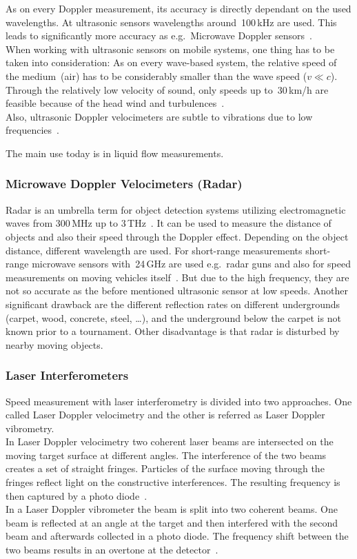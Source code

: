 \documentclass[12pt,a4paper]{article}
\begin{document}
As on every Doppler measurement, its accuracy is directly dependant on the used wavelengths.
At ultrasonic sensors wavelengths around~100\,kHz are used. 
This leads to significantly more accuracy as e.g.\ Microwave Doppler sensors~\cite{ultrasonic}.\\
When working with ultrasonic sensors on mobile systems, one thing has to be taken into consideration: 
As on every wave-based system, the relative speed of the medium~(air) has to be considerably smaller than the wave speed ($v \ll c$).
Through the relatively low velocity of sound, only speeds up to~30\,km/h are feasible because of the head wind and turbulences~\cite{ultrasonic}.\\
Also, ultrasonic Doppler velocimeters are subtle to vibrations due to low frequencies~\cite{agri}.

The main use today is in liquid flow measurements.



\subsubsection{Microwave Doppler Velocimeters (Radar)}

Radar is an umbrella term for object detection systems utilizing electromagnetic waves from 300\,MHz up to 3\,THz~\cite{nrt}.
It can be used to measure the distance of objects and also their speed through the Doppler effect.
Depending on the object distance, different wavelength are used.
For short-range measurements short-range microwave sensors with~24\,GHz are used e.g.\ radar guns and also for speed measurements on moving vehicles itself~\cite{s_r_radar}.
But due to the high frequency, they are not so accurate as the before mentioned ultrasonic sensor at low speeds.
Another significant drawback are the different reflection rates on different undergrounds (carpet, wood, concrete, steel, \dots), and the underground below the carpet is not known prior to a tournament.
Other disadvantage is that radar is disturbed by nearby moving objects.


\subsubsection{Laser Interferometers}

Speed measurement with laser interferometry is divided into two approaches.
One called Laser Doppler velocimetry and the other is referred as Laser Doppler vibrometry.\\
In Laser Doppler velocimetry two coherent laser beams are intersected on the moving target surface at different angles.
The interference of the two beams creates a set of straight fringes. 
Particles of the surface moving through the fringes reflect light on the constructive interferences.
The resulting frequency is then captured by a photo diode~\cite{laser_vel}.\\
In a Laser Doppler vibrometer the beam is split into two coherent beams.
One beam is reflected at an angle at the target and then interfered with the second beam and afterwards collected in a photo diode. 
The frequency shift between the two beams results in an overtone at the detector~\cite{vibro}.
\end{document}
